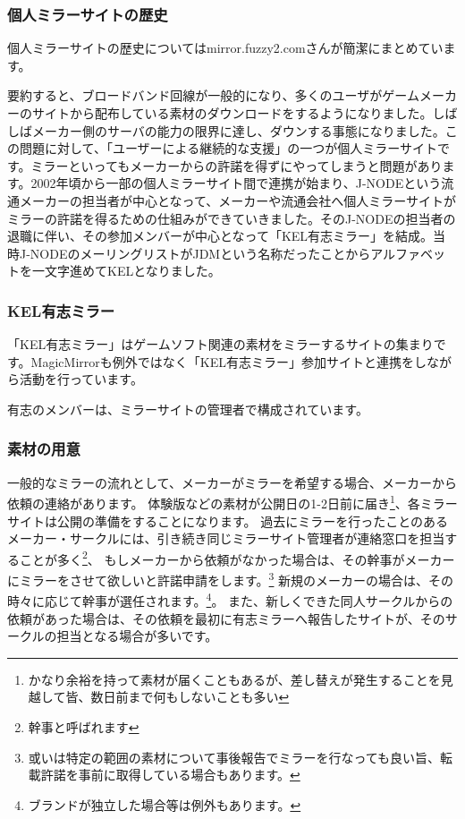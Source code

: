 \subsubsection{個人ミラーサイトの歴史}
個人ミラーサイトの歴史についてはmirror.fuzzy2.comさんが簡潔にまとめています。\cite{fuzzy2_1}

要約すると、ブロードバンド回線が一般的になり、多くのユーザがゲームメーカーのサイトから配布している素材のダウンロードをするようになりました。しばしばメーカー側のサーバの能力の限界に達し、ダウンする事態になりました。この問題に対して、「ユーザーによる継続的な支援」の一つが個人ミラーサイトです。ミラーといってもメーカーからの許諾を得ずにやってしまうと問題があります。2002年頃から一部の個人ミラーサイト間で連携が始まり、J-NODEという流通メーカーの担当者が中心となって、メーカーや流通会社へ個人ミラーサイトがミラーの許諾を得るための仕組みができていきました。そのJ-NODEの担当者の退職に伴い、その参加メンバーが中心となって「KEL有志ミラー」を結成。当時J-NODEのメーリングリストがJDMという名称だったことからアルファベットを一文字進めてKELとなりました。\cite{XES}


\subsubsection{KEL有志ミラー}

「KEL有志ミラー」はゲームソフト関連の素材をミラーするサイトの集まりです。MagicMirrorも例外ではなく「KEL有志ミラー」参加サイトと連携をしながら活動を行っています。

有志のメンバーは、ミラーサイトの管理者で構成されています。

\subsubsection{素材の用意}

一般的なミラーの流れとして、メーカーがミラーを希望する場合、メーカーから依頼の連絡があります。%
体験版などの素材が公開日の1-2日前に届き\footnote{かなり余裕を持って素材が届くこともあるが、差し替えが発生することを見越して皆、数日前まで何もしないことも多い}、各ミラーサイトは公開の準備をすることになります。%
過去にミラーを行ったことのあるメーカー・サークルには、引き続き同じミラーサイト管理者が連絡窓口を担当することが多く\footnote{幹事と呼ばれます}、%
もしメーカーから依頼がなかった場合は、その幹事がメーカーにミラーをさせて欲しいと許諾申請をします。\footnote{或いは特定の範囲の素材について事後報告でミラーを行なっても良い旨、転載許諾を事前に取得している場合もあります。}%
新規のメーカーの場合は、その時々に応じて幹事が選任されます。\footnote{ブランドが独立した場合等は例外もあります。}。%
また、新しくできた同人サークルからの依頼があった場合は、その依頼を最初に有志ミラーへ報告したサイトが、そのサークルの担当となる場合が多いです。\cite{XES}


